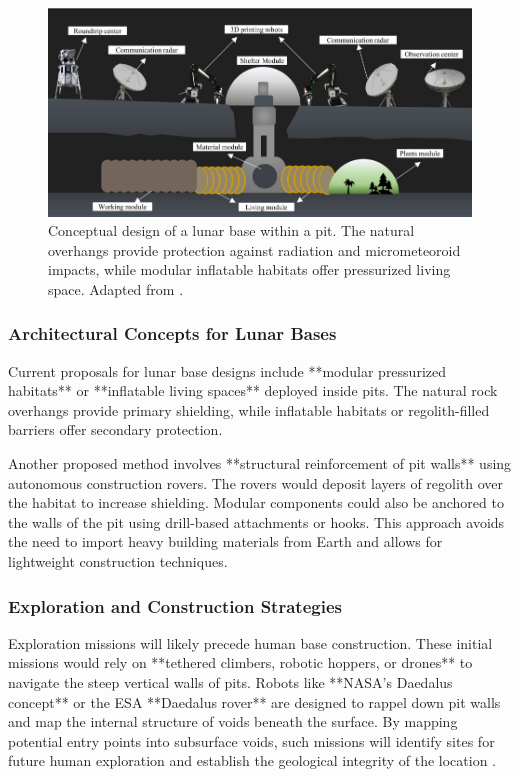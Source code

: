 \begin{figure}[H]
    \centering
    \includegraphics[width=0.75\linewidth]{simple-base-schema.png}
    \caption{Conceptual design of a lunar base within a pit. The natural overhangs provide protection against radiation and micrometeoroid impacts, while modular inflatable habitats offer pressurized living space. Adapted from \cite{bases-feng}.}
    \label{fig:lunar-pit-habitat-concept}
\end{figure}


\subsubsection{Architectural Concepts for Lunar Bases}

Current proposals for lunar base designs include **modular pressurized habitats** or **inflatable living spaces** deployed inside pits. The natural rock overhangs provide primary shielding, while inflatable habitats or regolith-filled barriers offer secondary protection. 

Another proposed method involves **structural reinforcement of pit walls** using autonomous construction rovers. The rovers would deposit layers of regolith over the habitat to increase shielding. Modular components could also be anchored to the walls of the pit using drill-based attachments or hooks. This approach avoids the need to import heavy building materials from Earth and allows for lightweight construction techniques.

\subsubsection{Exploration and Construction Strategies}

Exploration missions will likely precede human base construction. These initial missions would rely on **tethered climbers, robotic hoppers, or drones** to navigate the steep vertical walls of pits. Robots like **NASA's Daedalus concept** or the ESA **Daedalus rover** are designed to rappel down pit walls and map the internal structure of voids beneath the surface. By mapping potential entry points into subsurface voids, such missions will identify sites for future human exploration and establish the geological integrity of the location \cite{Carrer2024}.

